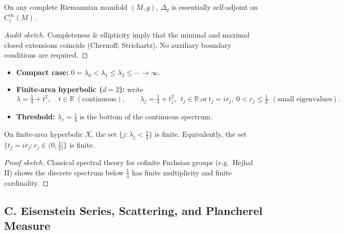 \begin{lemma}
\label{lem:esa-part1}
On any complete Riemannian manifold $(M,g)$, $\Delta_g$ is essentially self-adjoint on $C_c^\infty(M)$.
\end{lemma}

\begin{proof}[Audit sketch]
Completeness \& ellipticity imply that the minimal and maximal closed extensions coincide (Chernoff; Strichartz). No auxiliary boundary conditions are required.
\end{proof}

\begin{conditions}
\label{cond:spec-param-part1}
\begin{itemize}
  \item \textbf{Compact case:} $0=\lambda_0 < \lambda_1\le \lambda_2\le\cdots\to\infty$.
  \item \textbf{Finite-area hyperbolic ($d=2$):} write
  \[
    \lambda=\tfrac14+t^2,\quad t\in\mathbb R\ (\text{continuous}),\qquad
    \lambda_j=\tfrac14+t_j^2,\ \ t_j\in\mathbb R\ \text{or}\ t_j=ir_j,\ 0<r_j\le\tfrac12\ \ (\text{small eigenvalues}).
  \]
  \item \textbf{Threshold:} $\lambda_c=\tfrac14$ is the bottom of the continuous spectrum.
\end{itemize}
\end{conditions}

\begin{proposition}
\label{prop:finite-small-part1}
On finite-area hyperbolic $X$, the set $\{j:\lambda_j<\tfrac14\}$ is finite. Equivalently, the set $\{t_j=ir_j: r_j\in(0,\tfrac12]\}$ is finite.
\end{proposition}

\begin{proof}[Proof sketch]
Classical spectral theory for cofinite Fuchsian groups (e.g.\ Hejhal II) shows the discrete spectrum below $\tfrac14$ has finite multiplicity and finite cardinality.
\end{proof}


\subsection*{C. Eisenstein Series, Scattering, and Plancherel Measure}
\label{subsec:eisenstein-scattering-part1}

